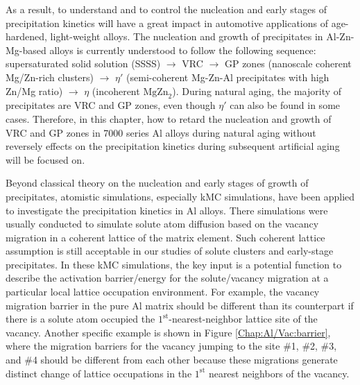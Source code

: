 As a result, to understand and to control the nucleation and early stages of precipitation kinetics will have a great impact in automotive applications of age-hardened, light-weight alloys\cite{deschamps1998influence,banhart2011kinetics,liang2012kinetics,deschamps2014precipitation}. The nucleation and growth of precipitates in Al-Zn-Mg-based alloys is currently understood to follow the following sequence: supersaturated solid solution (SSSS) $\rightarrow$ \acf{VRC} $\rightarrow$ \acf{GP} zones (nanoscale coherent Mg/Zn-rich clusters) $\rightarrow$ $\eta'$ (semi-coherent Mg-Zn-Al precipitates with high Zn/Mg ratio) $\rightarrow$ $\eta$ (incoherent $\text{MgZn}_\text{2}$)\cite{ragueneau2000review,deschamps2014precipitation,berg2001gp,chung2018transmission}. During natural aging, the majority of precipitates are \ac{VRC} and \ac{GP} zones, even though $\eta'$ can also be found in some cases\cite{mukhopadhyay1994guinier}. Therefore, in this chapter, how to retard the nucleation and growth of \ac{VRC} and \ac{GP} zones in 7000 series Al alloys during natural aging without reversely effects on the precipitation kinetics during subsequent artificial aging will be focused on. 

Beyond classical theory on the nucleation and early stages of growth of precipitates, atomistic simulations, especially \acf{kMC} simulations, have been applied to investigate the precipitation kinetics in Al alloys\cite{clouet2006kinetic,soisson2010atomistic,soisson1996monte,liang2012kinetics,sha2005kinetic,clouet2004nucleation,vincent2008precipitation,hirosawa1998comparison,sanchez1984generalized}. There simulations were usually conducted to simulate solute atom diffusion based on the vacancy migration in a coherent lattice of the matrix element. Such coherent lattice assumption is still acceptable in our studies of solute clusters and early-stage precipitates. In these \ac{kMC} simulations, the key input is a potential function to describe the activation barrier/energy for the solute/vacancy migration at a particular local lattice occupation environment. For example, the vacancy migration barrier in the pure Al matrix should be different than its counterpart if there is a solute atom occupied the $1^\text{st}$-nearest-neighbor lattice site of the vacancy. Another specific example is shown in Figure \ref{Chap:Al/Vac:barrier}, where the migration barriers for the vacancy jumping to the site \#1, \#2, \#3, and \#4 should be different from each other because these migrations generate distinct change of lattice occupations in the $1^\text{st}$ nearest neighbors of the vacancy.

